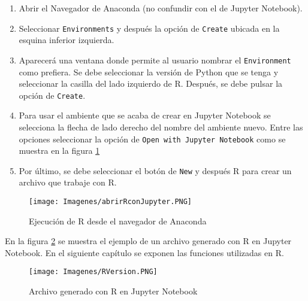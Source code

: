 \begin{enumerate}
	\item Abrir el Navegador de \textsf{Anaconda} (no confundir con el de \textsf{Jupyter Notebook}).
	
	\item Seleccionar \texttt{Environments} y después la opción de \texttt{Create} ubicada en la esquina inferior izquierda. 
	
	\item Aparecerá una ventana donde permite al usuario nombrar el \texttt{Environment} como prefiera. Se debe seleccionar la versión de \textsf{Python} que se tenga y seleccionar la casilla del lado izquierdo de \textsf{R}. Después, se debe pulsar la opción de \texttt{Create}. 
	
	\item Para usar el ambiente que se acaba de crear en \textsf{Jupyter Notebook} se selecciona la flecha de lado derecho del nombre del ambiente nuevo. Entre las opciones seleccionar la opción de \texttt{Open with Jupyter Notebook} como se muestra en la figura \ref{abrirRconJupyter}
	
	\item Por último, se debe seleccionar el botón de \texttt{New} y después \textsf{R} para crear un archivo que trabaje con \textsf{R}. 
\end{enumerate}

\begin{figure}[h]
	\begin{center}
		\texttt{[image: Imagenes/abrirRconJupyter.PNG]}
		\caption{Ejecución de R desde el navegador de Anaconda}
		\label{abrirRconJupyter}
	\end{center}
\end{figure}

En la figura \ref{rVersion} se muestra el ejemplo de un archivo generado con \textsf{R} en \textsf{Jupyter Notebook}. En el siguiente capítulo se exponen las funciones utilizadas en \textsf{R}. 

\begin{figure}[h]
	\begin{center}
		\texttt{[image: Imagenes/RVersion.PNG]}
		\caption{Archivo generado con R en Jupyter Notebook}
		\label{rVersion}
	\end{center}
\end{figure}


